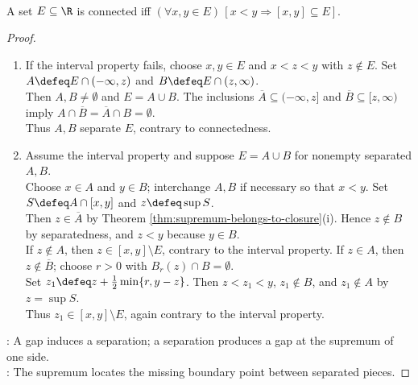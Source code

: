 \begin{theorem} \label{thm:connected-subsets-of-real-line-interval-property} \\
A set $E\subseteq\R$ is connected iff $(\forall x,y\in E)\,[x<y\Longrightarrow[x,y]\subseteq E]$.
\begin{proof}
\begin{enumerate}[label=\roman*.]
\setlength{\itemsep}{0pt}
\item[$(\Rightarrow)$] If the interval property fails, choose $x,y\in E$ and $x<z<y$ with $z\notin E$. Set $A\defeq E\cap(-\infty,z)$ and $B\defeq E\cap(z,\infty)$.\\
Then $A,B\neq\emptyset$ and $E=A\cup B$. The inclusions $\overline{A}\subseteq(-\infty,z]$ and $\overline{B}\subseteq[z,\infty)$ imply $A\cap\overline{B}=\overline{A}\cap B=\emptyset$.\\
Thus $A,B$ separate $E$, contrary to connectedness.
\item[$(\Leftarrow)$] Assume the interval property and suppose $E=A\cup B$ for nonempty separated $A,B$.\\
Choose $x\in A$ and $y\in B$; interchange $A,B$ if necessary so that $x<y$. Set $S\defeq A\cap[x,y]$ and $z\defeq\sup S$.\\
Then $z\in\overline{A}$ by Theorem \ref{thm:supremum-belongs-to-closure}(i). Hence $z\notin B$ by separatedness, and $z<y$ because $y\in B$.\\
If $z\notin A$, then $z\in[x,y]\setminus E$, contrary to the interval property. If $z\in A$, then $z\notin\overline{B}$; choose $r>0$ with $B_r(z)\cap B=\emptyset$.\\
Set $z_1\defeq z+\frac{1}{2}\min\{r,y-z\}$. Then $z<z_1<y$, $z_1\notin B$, and $z_1\notin A$ by $z=\sup S$.\\
Thus $z_1\in[x,y]\setminus E$, again contrary to the interval property.
\end{enumerate}
: A gap induces a separation; a separation produces a gap at the supremum of one side.\\
: The supremum locates the missing boundary point between separated pieces.
\end{proof}
\end{theorem}

